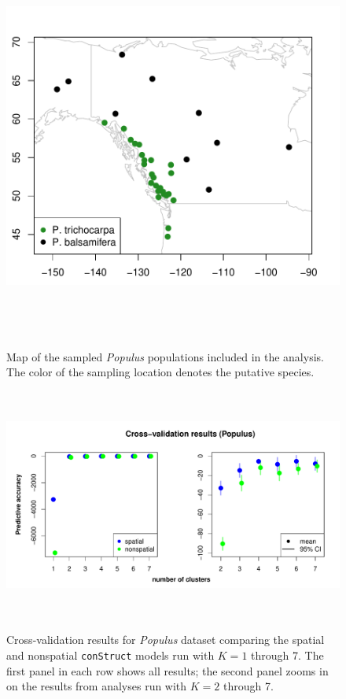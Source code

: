 \documentclass[12pt]{article}
\begin{document}
\begin{figure}
	\centering
		{\includegraphics[width=6in,height=5in]{figs/populus/populus_sampling_map.pdf}}
	\caption{
	Map of the sampled \textit{Populus} populations included in the analysis.
	The color of the sampling location denotes the putative species.
    }\label{populus_map}
\end{figure}

\begin{figure}
	\centering
		{\includegraphics[width=6in,height=3in]{figs/populus/populus_std_xval.pdf}}
	\caption{
	Cross-validation results for \textit{Populus} dataset 
	comparing the spatial and nonspatial \texttt{conStruct} models run with $K=1$ through 7.  
	The first panel in each row shows all results; 
	the second panel zooms in on the results from analyses run with $K = 2$ through 7.
    }\label{populus_xvals}
\end{figure}
\end{document}

